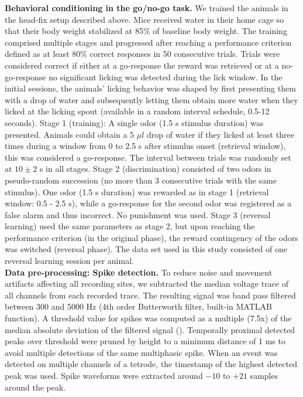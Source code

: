 \textbf{Behavioral conditioning in the go/no-go task.} We trained the animals in the head-fix setup described above. Mice received water in their home cage so that their body weight stabilized at 85$\%$ of baseline body weight. The training comprised multiple stages and progressed after reaching a performance criterion defined as at least 80$\%$ correct responses in 50 consecutive trials. Trials were considered correct if either at a go-response the reward was retrieved or at a no-go-response no significant licking was detected during the lick window. In the initial sessions, the animals’ licking behavior was shaped by first presenting them with a drop of water and subsequently letting them obtain more water when they licked at the licking spout (available in a random interval schedule, 0.5-12 seconds). Stage 1 (training): A single odor (1.5 s stimulus duration) was presented. Animals could obtain a 5 $\mu l$ drop of water if they licked at least three times during a window from 0 to 2.5 s after stimulus onset (retrieval window), this was considered a go-response. The interval between trials was randomly set at $10\pm 2$ s in all stages. Stage 2 (discrimination) consisted of two odors in pseudo-random succession (no more than 3 consecutive trials with the same stimulus). One odor (1.5 s duration) was rewarded as in stage 1 (retrieval window: 0.5 - 2.5 s), while a go-response for the second odor was registered as a false alarm and thus incorrect. No punishment was used. Stage 3 (reversal learning) used the same parameters as stage 2, but upon reaching the performance criterion (in the original phase), the reward contingency of the odors was switched (reversal phase). The data set used in this study consisted of one reversal learning session per animal.\\%
\textbf{Data pre-processing: Spike detection.} To reduce noise and movement artifacts affecting all recording sites, we subtracted the median voltage trace of all channels from each recorded trace. The resulting signal was band pass filtered between 300 and 5000 Hz (4th order Butterworth filter, built-in MATLAB function). A threshold value for spikes was computed as a multiple (7.5x) of the median absolute deviation of the filtered signal (\cite{Quiroga}). Temporally proximal detected peaks over threshold were pruned by height to a minimum distance of 1 ms to avoid multiple detections of the same multiphasic spike. When an event was detected on multiple channels of a tetrode, the timestamp of the highest detected peak was used. Spike waveforms were extracted around $-10$ to $+21$ samples around the peak.\\
